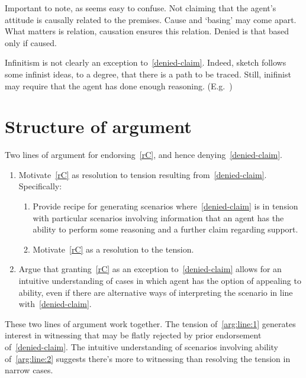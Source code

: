 {
  \begin{note}[No causality]
    Important to note, as seems easy to confuse.
    Not claiming that the agent's attitude is causally related to the premises.
    Cause and `basing' may come apart.
    What matters is relation, causation ensures this relation.
    Denied is that based only if caused.
  \end{note}

  \begin{note}
    Infinitism is not clearly an exception to~\ref{denied-claim}.
    Indeed, sketch follows some infinist ideas, to a degree, that there is a path to be traced.
    Still, inifinist may require that the agent has done enough reasoning.
    (E.g.\ \textcite[10]{Klein:2007ve})
  \end{note}
}

\section{Structure of argument}
\label{sec:structure-argument}

\begin{note}
  Two lines of argument for endorsing~\ref{rC}, and hence denying~\ref{denied-claim}.
  \begin{enumerate}[label=(L\arabic*), ref=(L\arabic*)]
  \item\label{arg:line:1} Motivate~\ref{rC} as resolution to tension resulting from~\ref{denied-claim}.\newline
    Specifically:
    \begin{enumerate}[label=(L1\alph*)]
    \item\label{arg:line:1:a} Provide recipe for generating scenarios where~\ref{denied-claim} is in tension with particular scenarios involving information that an agent has the ability to perform some reasoning and a further claim regarding support.
    \item\label{arg:line:1:b} Motivate~\ref{rC} as a resolution to the tension.
    \end{enumerate}
  \item\label{arg:line:2} Argue that granting~\ref{rC} as an exception to~\ref{denied-claim} allows for an intuitive understanding of cases in which agent has the option of appealing to ability, even if there are alternative ways of interpreting the scenario in line with~\ref{denied-claim}.
  \end{enumerate}
  These two lines of argument work together.
  The tension of~\ref{arg:line:1} generates interest in witnessing that may be flatly rejected by prior endorsement of~\ref{denied-claim}.
  The intuitive understanding of scenarios involving ability of~\ref{arg:line:2} suggests there's more to witnessing than resolving the tension in narrow cases.
\end{note}


